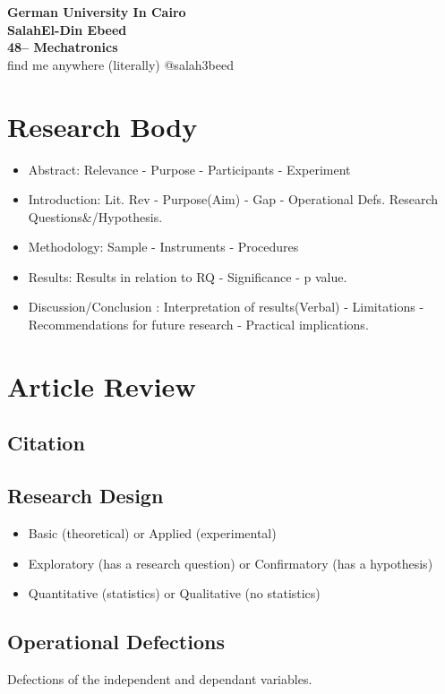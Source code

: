 \documentclass[11pt]{article}
\begin{document}
\setcounter{section}{0}
\begin{center}
{\LARGE \textbf{German University In Cairo
	\\ SalahEl-Din Ebeed 
	\\ 48-- Mechatronics
}
\\}  find me anywhere (literally) @salah3beed
\end{center}
\section{Research Body}
\begin{itemize}

\item Abstract: Relevance - Purpose - Participants - Experiment 
\item Introduction: Lit. Rev - Purpose(Aim) - Gap - Operational Defs. Research Questions\&/Hypothesis. 
\item Methodology: Sample - Instruments - Procedures 
\item Results: Results in relation to  RQ - Significance - p value.
\item Discussion/Conclusion : Interpretation of results(Verbal) - Limitations - Recommendations for future research - Practical implications.
\end{itemize}

\section{Article Review}
\subsection{Citation}

\subsection{Research Design}
\begin{itemize}

	\item Basic (theoretical) or Applied (experimental)
	\item Exploratory (has a research question) or Confirmatory (has a hypothesis)
	\item Quantitative (statistics) or Qualitative (no statistics)

\end{itemize}
\subsection{Operational Defections}
Defections of the independent  and dependant variables.
\end{document}
